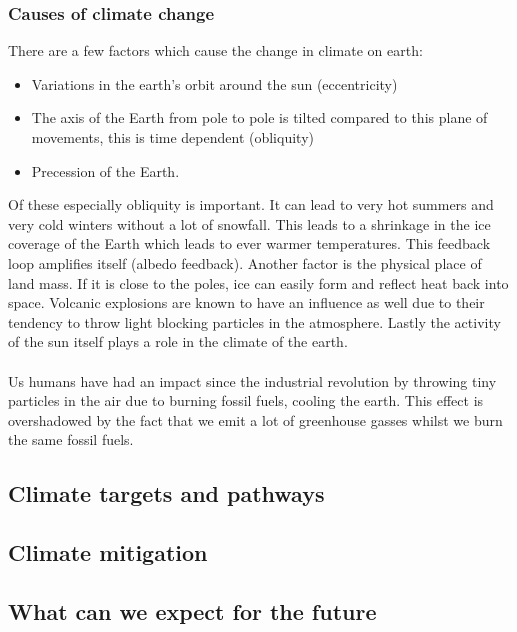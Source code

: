 \documentclass[../summary.tex]{subfiles}
\begin{document}
			\subsubsection{Causes of climate change}
				There are a few factors which cause the change in climate on earth:
				\begin{itemize}
					\item Variations in the earth's orbit around the sun (eccentricity)
					\item The axis of the Earth from pole to pole is tilted compared to this plane of movements, this is time dependent (obliquity)
					\item Precession of the Earth. 
				\end{itemize}
				Of these especially obliquity is important. It can lead to very hot summers and very cold winters without a lot of snowfall. This leads to a shrinkage in the ice coverage of the Earth which leads to ever warmer temperatures. This feedback loop amplifies itself (albedo feedback). Another factor is the physical place of land mass. If it is close to the poles, ice can easily form and reflect heat back into space. Volcanic explosions are known to have an influence as well due to their tendency to throw light blocking particles in the atmosphere. Lastly the activity of the sun itself plays a role in the climate of the earth. \\
				\\
				Us humans have had an impact since the industrial revolution by throwing tiny particles in the air due to burning fossil fuels, cooling the earth. This effect is overshadowed by the fact that we emit a lot of greenhouse gasses whilst we burn the same fossil fuels. 
		\subsection{Climate targets and pathways}
		
		\subsection{Climate mitigation}
		
		\subsection{What can we expect for the future}
	
\end{document}
